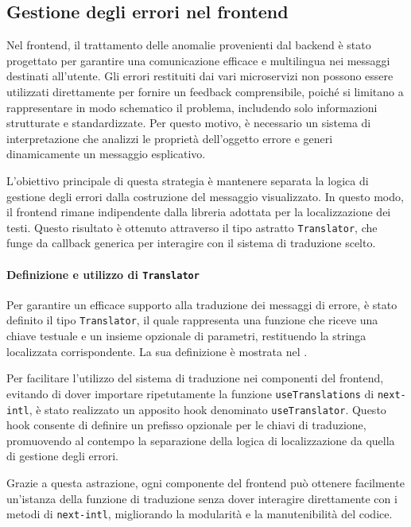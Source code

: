 \subsection{Gestione degli errori nel frontend}
Nel frontend, il trattamento delle anomalie provenienti dal backend è stato progettato per garantire una comunicazione efficace e multilingua nei messaggi destinati all’utente. Gli errori restituiti dai vari microservizi non possono essere utilizzati direttamente per fornire un feedback comprensibile, poiché si limitano a rappresentare in modo schematico il problema, includendo solo informazioni strutturate e standardizzate. Per questo motivo, è necessario un sistema di interpretazione che analizzi le proprietà dell'oggetto errore e generi dinamicamente un messaggio esplicativo.

L’obiettivo principale di questa strategia è mantenere separata la logica di gestione degli errori dalla costruzione del messaggio visualizzato. In questo modo, il frontend rimane indipendente dalla libreria adottata per la localizzazione dei testi. Questo risultato è ottenuto attraverso il tipo astratto \texttt{Translator}, che funge da callback generica per interagire con il sistema di traduzione scelto.

\paragraph{Definizione e utilizzo di \texttt{Translator}}
Per garantire un efficace supporto alla traduzione dei messaggi di errore, è stato definito il tipo \texttt{Translator}, il quale rappresenta una funzione che riceve una chiave testuale e un insieme opzionale di parametri, restituendo la stringa localizzata corrispondente. La sua definizione è mostrata nel .

Per facilitare l’utilizzo del sistema di traduzione nei componenti del frontend, evitando di dover importare ripetutamente la funzione \texttt{useTranslations} di \texttt{next-intl}, è stato realizzato un apposito hook denominato \texttt{useTranslator}. Questo hook consente di definire un prefisso opzionale per le chiavi di traduzione, promuovendo al contempo la separazione della logica di localizzazione da quella di gestione degli errori.
%

%
Grazie a questa astrazione, ogni componente del frontend può ottenere facilmente un’istanza della funzione di traduzione senza dover interagire direttamente con i metodi di \texttt{next-intl}, migliorando la modularità e la manutenibilità del codice.

